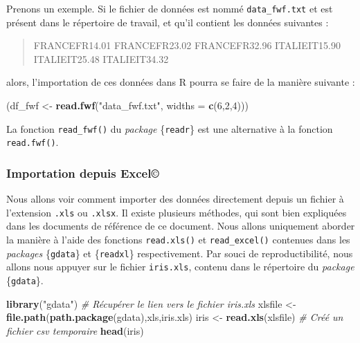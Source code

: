 \documentclass[
  11pt,
]{book}
\newenvironment{Shaded}{\begin{snugshade}}{\end{snugshade}}
\newcommand{\CommentTok}[1]{\textcolor[rgb]{0.56,0.35,0.01}{\textit{#1}}}
\newcommand{\DataTypeTok}[1]{\textcolor[rgb]{0.13,0.29,0.53}{#1}}
\newcommand{\DecValTok}[1]{\textcolor[rgb]{0.00,0.00,0.81}{#1}}
\newcommand{\KeywordTok}[1]{\textcolor[rgb]{0.13,0.29,0.53}{\textbf{#1}}}
\newcommand{\NormalTok}[1]{#1}
\newcommand{\StringTok}[1]{\textcolor[rgb]{0.31,0.60,0.02}{#1}}
\numberwithin{equation}{section}
\newcounter{countremarque}
\newenvironment{remarque}{%
 \refstepcounter{countremarque}
    \begin{tcolorbox}[width=\linewidth, colback=blue!3, boxrule=0.5pt,arc=0pt,title = Remarque \thecountremarque]
    }%
    {
    \end{tcolorbox}
    }
\numberwithin{countremarque}{section}
\begin{document}
Prenons un exemple. Si le fichier de données est nommé \texttt{data\_fwf.txt} et est présent dans le répertoire de travail, et qu'il contient les données suivantes :

\begin{quote}
FRANCEFR14.01
FRANCEFR23.02
FRANCEFR32.96
ITALIEIT15.90
ITALIEIT25.48
ITALIEIT34.32
\end{quote}

alors, l'importation de ces données dans R pourra se faire de la manière suivante :

\begin{Shaded}
\begin{Highlighting}[]
\NormalTok{(df\_fwf \textless{}{-}}\StringTok{ }\KeywordTok{read.fwf}\NormalTok{(}\StringTok{"data\_fwf.txt"}\NormalTok{, }\DataTypeTok{widths =} \KeywordTok{c}\NormalTok{(}\DecValTok{6}\NormalTok{,}\DecValTok{2}\NormalTok{,}\DecValTok{4}\NormalTok{)))}
\end{Highlighting}
\end{Shaded}

\begin{remarque}
La fonction \texttt{read\_fwf()} du \emph{package} \{\texttt{readr}\} est une alternative à la fonction \texttt{read.fwf()}.
\end{remarque}

\hypertarget{importation-depuis-excel}{%
\subsubsection{Importation depuis Excel©}\label{importation-depuis-excel}}

Nous allons voir comment importer des données directement depuis un fichier à l'extension \texttt{.xls} ou \texttt{.xlsx}. Il existe plusieurs méthodes, qui sont bien expliquées dans les documents de référence de ce document. Nous allons uniquement aborder la manière à l'aide des fonctions \texttt{read.xls()} et \texttt{read\_excel()} contenues dans les \emph{packages} \{\texttt{gdata}\} et \{\texttt{readxl}\} respectivement. Par souci de reproductibilité, nous allons nous appuyer sur le fichier \texttt{iris.xls}, contenu dans le répertoire du \emph{package} \{\texttt{gdata}\}.

\begin{Shaded}
\begin{Highlighting}[]
\KeywordTok{library}\NormalTok{(}\StringTok{"gdata"}\NormalTok{)}
\CommentTok{\# Récupérer le lien vers le fichier iris.xls}
\NormalTok{xlsfile \textless{}{-}}\StringTok{ }\KeywordTok{file.path}\NormalTok{(}\KeywordTok{path.package}\NormalTok{(}\StringTok{\textquotesingle{}gdata\textquotesingle{}}\NormalTok{),}\StringTok{\textquotesingle{}xls\textquotesingle{}}\NormalTok{,}\StringTok{\textquotesingle{}iris.xls\textquotesingle{}}\NormalTok{)}
\NormalTok{iris \textless{}{-}}\StringTok{ }\KeywordTok{read.xls}\NormalTok{(xlsfile) }\CommentTok{\# Créé un fichier csv temporaire}
\KeywordTok{head}\NormalTok{(iris)}
\end{Highlighting}
\end{Shaded}
\end{document}
